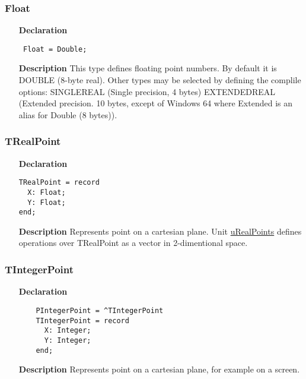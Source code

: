 \documentclass[12pt,a4paper,oneside]{report}
\newcommand{\lmath}[1]{   %
	\marginpar{\vspace{#1} 
		\begin{flushright}
			LMath
	\end{flushright} }
}
\newcommand{\declarationitem}[1]{\textbf{#1}}
\newcommand{\descriptiontitle}[1]{\textbf{#1}}
\newcommand{\code}[1]{\texttt{#1}}
\begin{document}
\subsubsection{Float}
\label{utypes-Float}
\begin{itemize}\item[\declarationitem{Declaration}\hfill]
	\begin{flushleft}
		\code{
			Float = Double;}
		
	\end{flushleft}
	
	\par
	\item[\descriptiontitle{Description}]
	This type defines floating point numbers. By default it is DOUBLE (8{-}byte real). Other types may be selected by defining the complile options:
	SINGLEREAL (Single precision, 4 bytes) EXTENDEDREAL (Extended precision. 10 bytes, except of Windows 64 where Extended is an alias for Double (8 bytes)).
\end{itemize}
\subsubsection{TRealPoint}\label{types:trealpoint}
\lmath{-24pt}
\begin{itemize}
	\item[\declarationitem{Declaration}\hfill]

\begin{verbatim}
TRealPoint = record
  X: Float;
  Y: Float;
end;
\end{verbatim}
\item[\descriptiontitle{Description}]
Represents point on a cartesian plane. Unit \hyperref[uRealPoints]{uRealPoints} defines operations over TRealPoint as a vector in 2-dimentional space.
\end{itemize}
\subsubsection{TIntegerPoint}\label{types:tintegerpoint}
\lmath{-24pt}
\begin{itemize}
	\item[\declarationitem{Declaration}\hfill]
	
	\begin{verbatim}
	PIntegerPoint = ^TIntegerPoint
	TIntegerPoint = record
	  X: Integer;
	  Y: Integer;
	end;
	\end{verbatim}
	\item[\descriptiontitle{Description}]
	Represents point on a cartesian plane, for example on a screen. 
\end{itemize}
\end{document}
